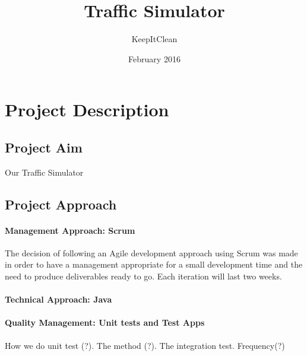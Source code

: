 \documentclass[11pt]{article}
\author{KeepItClean}
\title{Traffic Simulator}
\date{February 2016}
\begin{document}
\maketitle
\newpage

\section{Project Description}
\subsection{Project Aim}
Our Traffic Simulator 
\subsection{Project Approach}
	\paragraph{Management Approach: Scrum} The decision of following an Agile development approach using Scrum was made in order to have a management appropriate for a small development time and the need to produce deliverables ready to go. Each iteration will last two weeks.
	\paragraph{Technical Approach: Java} 
	\paragraph{Quality Management: Unit tests and Test Apps} How we do unit test (?). The method (?). The integration test. Frequency(?)
\end{document}
